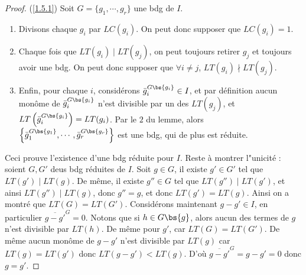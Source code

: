         \begin{proof} (\ref{1.5.1})
            Soit $G = \{g_1, \cdots, g_r\}$ une bdg de $I$.
            \begin{enumerate}
                \item Divisons chaque $g_i$ par $LC(g_i)$. On peut donc supposer que $LC(g_i) = 1$.
                \item Chaque fois que $LT(g_i) \mid LT(g_j)$, on peut toujours retirer $g_j$ et toujours avoir une bdg. On peut donc supposer que $\forall i \neq j$, $LT(g_i) \nmid LT(g_j)$.
                \item Enfin, pour chaque $i$, considérons $\bar g_i^{G \bs \{g_i\}} \in I$, et par définition aucun monôme de $\bar g_i^{G \bs \{g_i\}}$ n'est divisible par un des $LT(g_j)$, et $LT\left(\bar g_i^{G \bs \{g_i\}}\right) = LT(g_i)$. Par le $2$ du lemme, alors $\left\{ \bar g_1^{G \bs \{g_1\}}, \cdots, \bar g_r^{G \bs \{g_r\}} \right\}$ est une bdg, qui de plus est réduite.
            \end{enumerate}
            Ceci prouve l'existence d'une bdg réduite pour $I$. Reste à montrer l"unicité : soient $G,G'$ deus bdg réduites de $I$. Soit $g \in G$, il existe $g' \in G'$ tel que $LT(g') \mid LT(g)$. De même, il existe $g'' \in G$ tel que $LT(g'') \mid LT(g')$, et ainsi $LT(g'') \mid LT(g)$, donc $g'' = g$, et donc $LT(g') = LT(g)$. Ainsi on a montré que $LT(G) = LT(G')$. Considérons maintenant $g - g' \in I$, en particulier $\overline{g - g'}^G = 0$. Notons que si $h \in G \bs \{g\}$, alors aucun des termes de $g$ n'est divisible par $LT(h)$. De même pour $g'$, car $LT(G) = LT(G')$. De même aucun monôme de $g - g'$ n'est divisible par $LT(g)$ car $LT(g) = LT(g')$ donc $LT(g - g') < LT(g)$. D'où $\overline{g - g'}^G = g- g' = 0$ donc $g = g'$.
        \end{proof}
